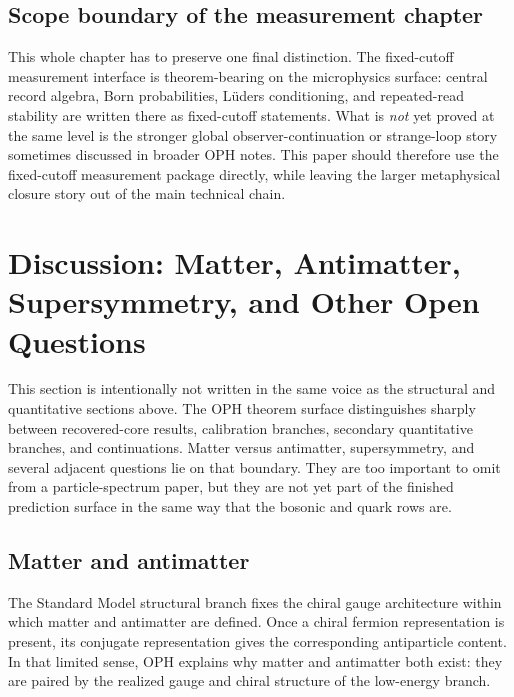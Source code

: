 \documentclass[11pt]{article}
\begin{document}
\subsection{Scope boundary of the measurement chapter}

This whole chapter has to preserve one final distinction. The fixed-cutoff measurement interface
is theorem-bearing on the microphysics surface: central record algebra, Born
probabilities, L\"uders conditioning, and repeated-read stability are written there as
fixed-cutoff statements. What is \emph{not} yet proved at the same level is the stronger global
observer-continuation or strange-loop story sometimes discussed in broader OPH notes. This
paper should therefore use the fixed-cutoff measurement package directly, while leaving
the larger metaphysical closure story out of the main technical chain.

\section{Discussion: Matter, Antimatter, Supersymmetry, and Other Open Questions}

This section is intentionally not written in the same voice as the structural and quantitative
sections above. The OPH theorem surface distinguishes sharply between recovered-core
results, calibration branches, secondary quantitative branches, and continuations. Matter versus
antimatter, supersymmetry, and several adjacent questions lie on that boundary. They are too
important to omit from a particle-spectrum paper, but they are not yet part of the finished
prediction surface in the same way that the bosonic and quark rows are.

\subsection{Matter and antimatter}

The Standard Model structural branch fixes the chiral gauge architecture within which
matter and antimatter are defined. Once a chiral fermion representation is present, its conjugate
representation gives the corresponding antiparticle content. In that limited sense, OPH explains
why matter and antimatter both exist: they are paired by the realized gauge and chiral structure
of the low-energy branch.
\end{document}
